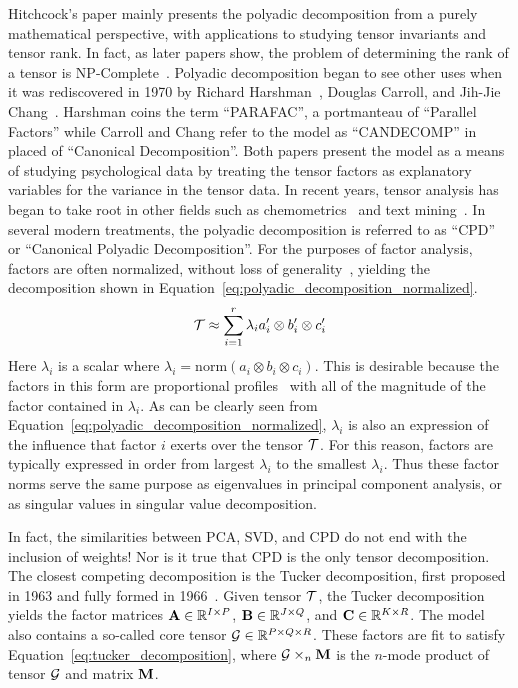 \documentclass[../dissertation.tex]{subfiles}
\begin{document}
Hitchcock's paper mainly presents the polyadic decomposition from a
purely mathematical perspective, with applications to studying tensor
invariants and tensor rank.  In fact, as later papers show, the
problem of determining the rank of a tensor is
NP-Complete~\cite{haastad1990}.  Polyadic decomposition began to see
other uses when it was rediscovered in 1970 by Richard
Harshman~\cite{harshman1970}, Douglas Carroll, and Jih-Jie
Chang~\cite{carroll1970}.  Harshman coins the term ``PARAFAC'', a
portmanteau of ``Parallel Factors'' while Carroll and Chang refer to
the model as ``CANDECOMP'' in placed of ``Canonical Decomposition''.
Both papers present the model as a means of studying psychological
data by treating the tensor factors as explanatory variables for the
variance in the tensor data.  In recent years, tensor analysis has
began to take root in other fields such as chemometrics~\cite{bro1997}
and text mining~\cite{bader2007}.  In several modern treatments, the
polyadic decomposition is referred to as ``CPD'' or ``Canonical
Polyadic Decomposition''.  For the purposes of factor analysis,
factors are often normalized, without loss of
generality~\cite{bro1997, bader2007}, yielding the decomposition shown
in Equation~\ref{eq:polyadic_decomposition_normalized}.
\begin{equation} \label{eq:polyadic_decomposition_normalized}
  \mathcal{T} \approx \displaystyle\sum_{i=1}^{r} \lambda_i a'_i
  \otimes b'_i \otimes c'_i
\end{equation}
Here $\lambda_i$ is a scalar where $\lambda_i = \mathrm{norm}(a_i
\otimes b_i \otimes c_i)$.  This is desirable because the factors in
this form are proportional profiles~\cite{harshman1970} with all of
the magnitude of the factor contained in $\lambda_i$.  As can be
clearly seen from Equation~\ref{eq:polyadic_decomposition_normalized},
$\lambda_i$ is also an expression of the influence that factor $i$
exerts over the tensor $\mathcal{T}$.  For this reason, factors are
typically expressed in order from largest $\lambda_i$ to the smallest
$\lambda_i$.  Thus these factor norms serve the same purpose as
eigenvalues in principal component analysis, or as singular values in
singular value decomposition.

In fact, the similarities between PCA, SVD, and CPD do not end with
the inclusion of weights!  Nor is it true that CPD is the only tensor
decomposition.  The closest competing decomposition is the Tucker
decomposition, first proposed in 1963 and fully formed in
1966~\cite{kolda2009}.  Given tensor $\mathcal{T}$, the Tucker
decomposition yields the factor matrices $\mathrm{\bf 
  A}\in\mathbb{R}^{I\times P}$, $\mathrm{\bf  B} \in
\mathbb{R}^{J\times Q}$, and $\mathrm{\bf  C}\in
\mathbb{R}^{K\times R}$.  The model also contains a so-called core
tensor $\mathcal{G} \in \mathbb{R}^{P\times Q \times R}$.  These
factors are fit to satisfy Equation~\ref{eq:tucker_decomposition},
where $\mathcal{G} \times_n \mathrm{\bf M}$ is the $n$-mode product of
tensor $\mathcal{G}$ and matrix $\mathrm{\bf M}$.  
\end{document}
